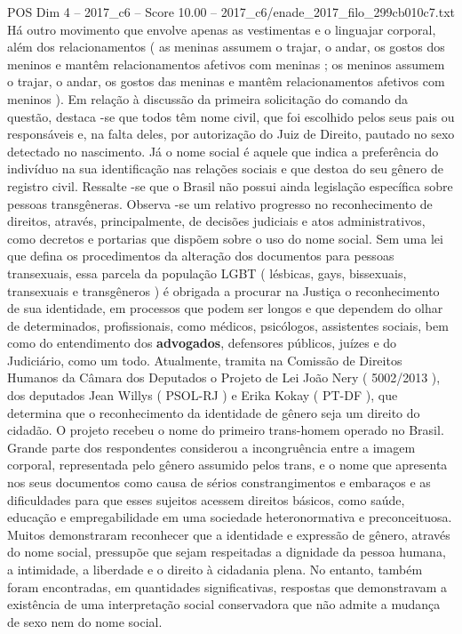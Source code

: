 \begin{textsample}{POS Dim 4 – 2017\_c6 – Score 10.00 – 2017\_c6/enade\_2017\_filo\_299cb010c7.txt}
Há outro movimento que envolve apenas as vestimentas e o linguajar corporal, além dos relacionamentos ( as meninas assumem o trajar, o andar, os gostos dos meninos e mantêm relacionamentos afetivos com meninas ; os meninos assumem o trajar, o andar, os gostos das meninas e mantêm relacionamentos afetivos com meninos ).
Em relação à discussão da primeira solicitação do comando da questão, destaca -se que todos têm nome civil, que foi escolhido pelos seus pais ou responsáveis e, na falta deles, por autorização do Juiz de Direito, pautado no sexo detectado no nascimento.
Já o nome social é aquele que indica a preferência do indivíduo na sua identificação nas relações sociais e que destoa do seu gênero de registro civil.
Ressalte -se que o Brasil não possui ainda legislação específica sobre pessoas transgêneras.
Observa -se um relativo progresso no reconhecimento de direitos, através, principalmente, de decisões judiciais e atos administrativos, como decretos e portarias que dispõem sobre o uso do nome social.
Sem uma lei que defina os procedimentos da alteração dos documentos para pessoas transexuais, essa parcela da população LGBT ( lésbicas, gays, bissexuais, transexuais e transgêneros ) é obrigada a procurar na Justiça o reconhecimento de sua identidade, em processos que podem ser longos e que dependem do olhar de determinados, profissionais, como médicos, psicólogos, assistentes sociais, bem como do entendimento dos \textbf{advogados}, defensores públicos, juízes e do Judiciário, como um todo.
Atualmente, tramita na Comissão de Direitos Humanos da Câmara dos Deputados o Projeto de Lei João Nery ( 5002/2013 ), dos deputados Jean Willys ( PSOL-RJ ) e Erika Kokay ( PT-DF ), que determina que o reconhecimento da identidade de gênero seja um direito do cidadão.
O projeto recebeu o nome do primeiro trans-homem operado no Brasil.
Grande parte dos respondentes considerou a incongruência entre a imagem corporal, representada pelo gênero assumido pelos trans, e o nome que apresenta nos seus documentos como causa de sérios constrangimentos e embaraços e as dificuldades para que esses sujeitos acessem direitos básicos, como saúde, educação e empregabilidade em uma sociedade heteronormativa e preconceituosa.
Muitos demonstraram reconhecer que a identidade e expressão de gênero, através do nome social, pressupõe que sejam respeitadas a dignidade da pessoa humana, a intimidade, a liberdade e o direito à cidadania plena.
No entanto, também foram encontradas, em quantidades significativas, respostas que demonstravam a existência de uma interpretação social conservadora que não admite a mudança de sexo nem do nome social.

\end{textsample}
